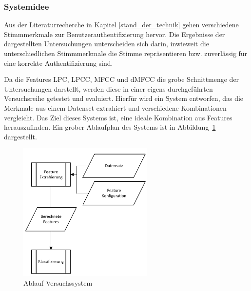 \subsubsection{Systemidee}

Aus der Literaturrecherche in Kapitel \ref{stand_der_technik} gehen verschiedene Stimmmerkmale zur Benutzerauthentifizierung hervor.
Die Ergebnisse der dargestellten Untersuchungen unterscheiden sich darin, inwieweit die unterschiedlichen Stimmmerkmale die Stimme repräsentieren bzw. zuverlässig für eine korrekte Authentifizierung sind.

Da die Features \ac{LPC}, \ac{LPCC}, \ac{MFCC} und \ac{dMFCC} die grobe Schnittmenge der Untersuchungen darstellt, werden diese in einer eigens durchgeführten Versuchsreihe getestet und evaluiert.
Hierfür wird ein System entworfen, das die Merkmale aus einem Datenset extrahiert und verschiedene Kombinationen vergleicht.
Das Ziel dieses Systems ist, eine ideale Kombination aus Features herauszufinden.
Ein grober Ablaufplan des Systems ist in Abbildung~\ref{fig:PAP_DemoSystem} dargestellt.
\begin{figure}[H]
    \centering
    \includegraphics[width=0.6\textwidth, keepaspectratio]{images/PAP_Demosystem.pdf}
    \caption{Ablauf Versuchssystem}
    \label{fig:PAP_DemoSystem}
\end{figure}


